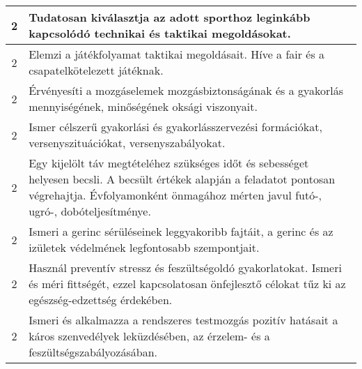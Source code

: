 \begin{longtable}{c | p{12cm} }
                                
                                          2 &  Tudatosan kiválasztja az adott sporthoz leginkább kapcsolódó technikai és taktikai megoldásokat. \\ \hline
                                          2 &  Elemzi a játékfolyamat taktikai megoldásait. Híve a fair és a csapatelkötelezett játéknak. \\ \hline
                                          2 &  Érvényesíti a mozgáselemek mozgásbiztonságának és a gyakorlás mennyiségének, minőségének oksági viszonyait. \\ \hline
                                          2 &  Ismer célszerű gyakorlási és gyakorlásszervezési formációkat, versenyszituációkat, versenyszabályokat. \\ \hline
                                          2 &  Egy kijelölt táv megtételéhez szükséges időt és sebességet helyesen becsli. A becsült értékek alapján a feladatot pontosan végrehajtja. Évfolyamonként önmagához mérten javul futó-, ugró-, dobóteljesítménye. \\ \hline
                                          2 &  Ismeri a gerinc sérüléseinek leggyakoribb fajtáit, a gerinc és az izületek védelmének legfontosabb szempontjait. \\ \hline
                                          2 &  Használ preventív stressz és feszültségoldó gyakorlatokat. Ismeri és méri fittségét, ezzel kapcsolatosan önfejlesztő célokat tűz ki az egészség-edzettség érdekében. \\ \hline
                                          2 &  Ismeri és alkalmazza a rendszeres testmozgás pozitív hatásait a káros szenvedélyek leküzdésében, az érzelem- és a feszültségszabályozásában. \\ \hline
                                      

\end{longtable}

